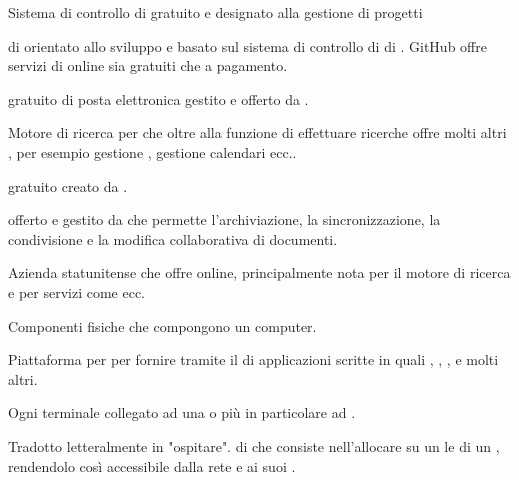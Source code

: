 { 
{Sistema di controllo di   gratuito e  designato alla gestione di progetti }

{ di   orientato allo sviluppo  e basato sul sistema di controllo di  di . GitHub offre servizi di  online sia gratuiti che a pagamento.}

{ gratuito di posta elettronica gestito e offerto da .}

{Motore di ricerca per  che oltre alla funzione di effettuare ricerche offre molti altri , per esempio gestione , gestione calendari ecc..} 

{ gratuito creato da .}

{ offerto e gestito da  che permette l'archiviazione, la sincronizzazione, la condivisione e la modifica collaborativa di documenti.}

{Azienda statunitense che offre  online, principalmente nota per il motore di ricerca  e per servizi come  ecc.}




{Componenti fisiche che compongono un computer.}


{Piattaforma  per per fornire  tramite il  di applicazioni scritte in  quali , , , e molti altri.}

{Ogni terminale collegato ad una  o più in particolare ad .}

{Tradotto letteralmente in "ospitare".  di  che consiste nell'allocare su un  le  di un , rendendolo così accessibile dalla rete  e ai suoi .}





}
